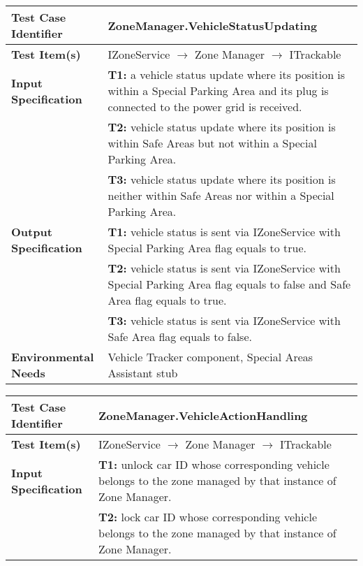{\noindent 
\begin{tabularx}{\textwidth}{l X}
    \hline 
    \textbf{Test Case Identifier} & ZoneManager.VehicleStatusUpdating\\ 
    \hline 
    
    \textbf{Test Item(s)} & IZoneService $\rightarrow$ Zone Manager $\rightarrow$ ITrackable\\ %
    \hline 
    
    \textbf{Input Specification} & \textbf{T1:} a vehicle status update where its position is within a Special Parking Area and its plug is connected to the power grid is received.\\
                                & \textbf{T2:} vehicle status update where its position is within Safe Areas but not within a Special Parking Area.\\
                                & \textbf{T3:} vehicle status update where its position is neither within Safe Areas nor within a Special Parking Area.\\
    \hline 
    
    \textbf{Output Specification} & \textbf{T1:} vehicle status is sent via IZoneService with Special Parking Area flag equals to true.\\
                                & \textbf{T2:} vehicle status is sent via IZoneService with Special Parking Area flag equals to false and Safe Area flag equals to true.\\
                                & \textbf{T3:} vehicle status is sent via IZoneService with Safe Area flag equals to false.\\
    \hline 
    
    \textbf{Environmental Needs} & Vehicle Tracker component, Special Areas Assistant stub\\
    \hline
\end{tabularx}
\bigskip 


\noindent 
\begin{tabularx}{\textwidth}{l X}
    \hline 
    \textbf{Test Case Identifier} & ZoneManager.VehicleActionHandling\\ 
    \hline 
    
    \textbf{Test Item(s)} & IZoneService $\rightarrow$ Zone Manager $\rightarrow$ ITrackable\\
    \hline 
    
    \textbf{Input Specification} & \textbf{T1:} unlock car ID whose corresponding vehicle belongs to the zone managed by that instance of Zone Manager.\\
                                & \textbf{T2:} lock car ID whose corresponding vehicle belongs to the zone managed by that instance of Zone Manager.\\
    \hline 
    

\end{tabularx}}
